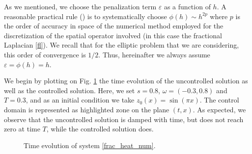 As we mentioned, we choose the penalization term $\varepsilon$ as a function of $h$. A reasonable practical rule (\cite{boyer2013penalised}) is to systematically choose $\phi(h)\sim h^{2p}$ where $p$ is the order of accuracy in space of the numerical method employed for the discretization of the spatial operator involved (in this case the fractional Laplacian \eqref{fl}). We recall that for the elliptic problem that we are considering, this order of convergence is $1/2$. Thus, hereinafter we always assume $\varepsilon=\phi(h)=h$.

We begin by plotting on Fig.  \ref{sol_surf} the time evolution of the uncontrolled solution as well as the controlled solution. Here, we set $s=0.8$, $\omega=(-0.3,0.8)$ and $T=0.3$, and as an initial condition we take $z_0(x) = \sin(\pi x)$. The control domain is represented as highlighted zone on the plane $(t,x)$. As expected, we observe that the uncontrolled solution is damped with time, but does not reach zero at time $T$, while the controlled solution does. 

\begin{figure}[ht]
 \centering
% 
%
\hspace{1 cm}
\caption{Time evolution of system \eqref{frac_heat_num}.}\label{fig_heat_frac}
\label{sol_surf}
\end{figure}

